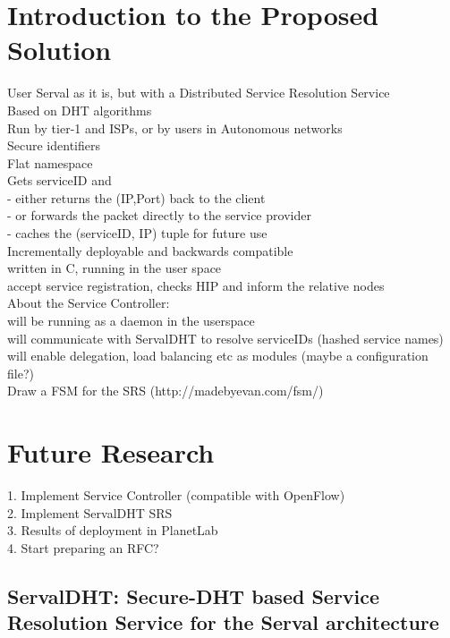 \documentclass[12pt,a4paper,oneside]{article}
\begin{document}
\newpage
\section{Introduction to the Proposed Solution}
User Serval as it is, but with a Distributed Service Resolution Service
\\Based on DHT algorithms
\\Run by tier-1 and ISPs, or by users in Autonomous networks
\\Secure identifiers
\\Flat namespace
\\Gets serviceID and
\\- either returns the (IP,Port) back to the client
\\- or forwards the packet directly to the service provider
\\- caches the (serviceID, IP) tuple for future use
\\Incrementally deployable and backwards compatible
\\written in C, running in the user space
\\accept service registration, checks HIP and inform the relative nodes
\\About the Service Controller:
\\will be running as a daemon in the userspace
\\will communicate with ServalDHT to resolve serviceIDs (hashed service names)
\\will enable delegation, load balancing etc as modules (maybe a configuration file?)
\\Draw a FSM for the SRS  (http://madebyevan.com/fsm/)


\newpage
\section{Future Research}
1. Implement Service Controller (compatible with OpenFlow)
\\2. Implement ServalDHT SRS
\\3. Results of deployment in PlanetLab
\\4. Start preparing an RFC?

\subsection{ServalDHT: Secure-DHT based Service Resolution Service for the Serval architecture}
\end{document}
